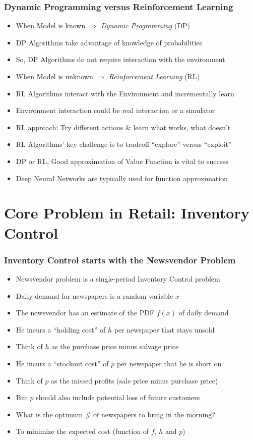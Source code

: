 \documentclass[handout]{beamer}
\begin{document}
\begin{frame}
\frametitle{Dynamic Programming versus Reinforcement Learning}
\pause
\begin{itemize}[<+->]
\item When Model is known $\Rightarrow$ {\em Dynamic Programming} (DP)
\item DP Algorithms take advantage of knowledge of probabilities
\item So, DP Algorithms do not require interaction with the environment
\item When Model is unknown $\Rightarrow$ {\em Reinforcement Learning} (RL)
\item RL Algorithms interact with the Environment and incrementally learn
\item Environment interaction could be real interaction or a simulator
\item RL approach: Try different actions \& learn what works, what doesn't
\item RL Algorithms' key challenge is to tradeoff ``explore'' versus ``exploit''
\item DP or RL, Good approximation of Value Function is vital to success
\item Deep Neural Networks are typically used for function approximation
\end{itemize}
\end{frame}


\section{Core Problem in Retail: Inventory Control}

\begin{frame}
\frametitle{Inventory Control starts with the Newsvendor Problem}
\pause
\begin{itemize}[<+->]
\item Newsvendor problem is a single-period Inventory Control problem
\item Daily demand for newspapers is a random variable $x$
\item The newsvendor has an estimate of the PDF $f(x)$ of daily demand
\item He incurs a ``holding cost'' of $h$ per newspaper that stays unsold
\item Think of $h$ as the purchase price minus salvage price
\item He incurs a ``stockout cost'' of $p$ per newspaper that he is short on
\item Think of $p$ as the missed profits (sale price minus purchase price)
\item But $p$ should also include potential loss of future customers
\item What is the optimum \# of newspapers to bring in the morning?
\item To minimize the expected cost (function of $f$, $h$ and $p$)
\end{itemize}
\end{frame}
\end{document}
